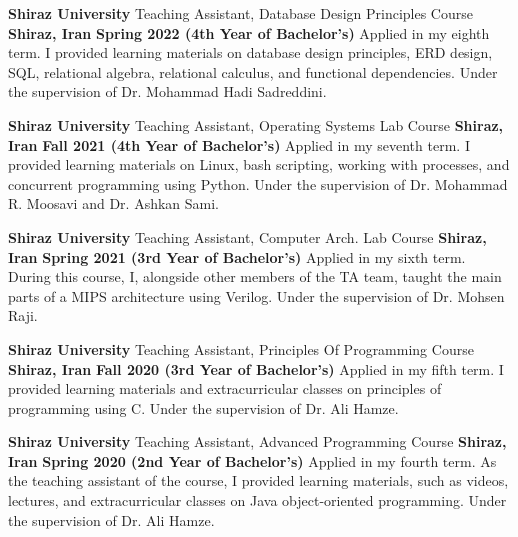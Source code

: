 

\begin{cventries}

  \cventry
    {\textbf{Shiraz University}} %
    {Teaching Assistant, Database Design Principles Course} %
    {\textbf{Shiraz, Iran}} %
    {\textbf{Spring 2022 (4th Year of Bachelor's)}} %
    {
      Applied in my eighth term. I provided learning materials on database design principles, ERD design,  SQL, relational algebra, relational calculus, and functional dependencies. Under the supervision of Dr. Mohammad Hadi Sadreddini.
    }

  \cventry
    {\textbf{Shiraz University}} %
    {Teaching Assistant, Operating Systems Lab Course} %
    {\textbf{Shiraz, Iran}} %
    {\textbf{Fall 2021 (4th Year of Bachelor’s)}} %
    {
        Applied in my seventh term. I provided learning materials on Linux, bash scripting, working with processes, and concurrent programming using Python. Under the supervision of Dr. Mohammad R. Moosavi and Dr. Ashkan Sami.
    }

    \cventry
    {\textbf{Shiraz University}} %
    {Teaching Assistant, Computer Arch. Lab Course} %
    {\textbf{Shiraz, Iran}} %
    {\textbf{Spring 2021 (3rd Year of Bachelor’s)}} %
    {
        Applied in my sixth term. During this course, I, alongside other members of the TA team, taught the main parts of a MIPS architecture using Verilog. Under the supervision of Dr. Mohsen Raji.
    }

    \cventry
    {\textbf{Shiraz University}} %
    {Teaching Assistant, Principles Of Programming Course} %
    {\textbf{Shiraz, Iran}} %
    {\textbf{Fall 2020 (3rd Year of Bachelor’s)}} %
    {
        Applied in my fifth term. I provided learning materials and extracurricular classes on principles of programming using C. Under the supervision of Dr. Ali Hamze.
    }

    \cventry
    {\textbf{Shiraz University}} %
    {Teaching Assistant, Advanced Programming Course} %
    {\textbf{Shiraz, Iran}} %
    {\textbf{Spring 2020 (2nd Year of Bachelor’s)}} %
    {
        Applied in my fourth term. As the teaching assistant of the course, I provided learning materials, such as videos, lectures, and extracurricular classes on Java object-oriented programming. Under the supervision of Dr. Ali Hamze.
    }


\end{cventries}
